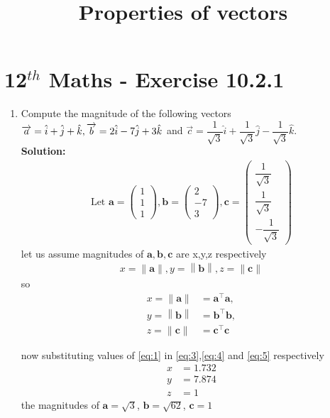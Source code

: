 \documentclass[12pt]{article}
\providecommand{\norm}[1]{\left\lVert#1\right\rVert}
\newcommand{\solution}{\noindent \textbf{Solution: }}
\newcommand{\myvec}[1]{\ensuremath{\begin{pmatrix}#1\end{pmatrix}}}
\let\vec\mathbf
\begin{document}
\begin{center}
\title{\textbf{Properties of vectors}}
\date{\vspace{-5ex}} %
\maketitle
\end{center}
\setcounter{page}{1}
\section*{12$^{th}$ Maths - Exercise 10.2.1}

\begin{enumerate}
\item Compute the magnitude of the following vectors 
$\\ \overrightarrow{a}=\hat{i}+\hat{j}+\hat{k},\overrightarrow{b}=2\hat{i}-7\hat{j}+3\hat{k}$ and $\overrightarrow{c}=\dfrac{1}{\sqrt{3}}\hat{i}+\dfrac{1}{\sqrt{3}}\hat{j}-\dfrac{1}{\sqrt{3}}\hat{k}$.\\
\solution
\begin{align}
\text{Let } \vec{a} = \myvec{1\\1\\1} , \vec{b} = \myvec{2\\ -7 \\ 3},\vec{c} = \myvec{\dfrac{1}{\sqrt{3}}\\ \dfrac{1}{\sqrt{3}} \\ -\dfrac{1}{\sqrt{3}}} 
\label{eq:1}
\end{align}
let us assume magnitudes of $\vec{a},\vec{b},\vec{c}$ are x,y,z respectively
\begin{align}
	x=\norm{\vec{a}} ,
	y=\norm{\vec{b}} ,
	z=\norm{\vec{c}}
	\label{eq:2}
\end{align}
so
\begin{align}
	x=\norm{\vec{a}}&={\vec{a}}^{\top}\vec{a}, 
	\label{eq:3}
	\\ y=\norm{\vec{b}}&={\vec{b}}^{\top}\vec{b}, 
	\label{eq:4}
	\\ z=\norm{\vec{c}}&={\vec{c}}^{\top}\vec{c}	
	\label{eq:5}
\end{align}

now substituting values of \eqref{eq:1} in \eqref{eq:3},\eqref{eq:4} and \eqref{eq:5} respectively
\begin{align}
	x&=1.732
\\	y&=7.874
\\	z&=1	
\end{align}
the magnitudes of $\vec{a}=\sqrt{3}$, $\vec{b}= \sqrt{62}$, $\vec{c}=1$

\end{enumerate}
\end{document}
